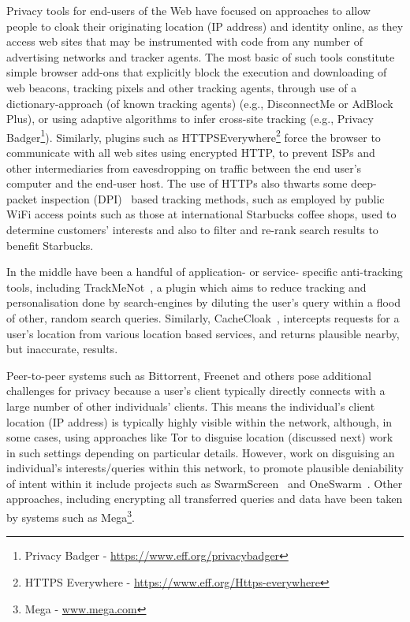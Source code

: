 \documentclass{IOS-Book-Article}     %
\begin{document}
Privacy tools for end-users of the Web have focused on approaches to allow people to cloak their originating location (IP address) and identity online, as they access web sites that may be instrumented with code from any number of advertising networks and tracker agents.  The most basic of such tools constitute simple browser add-ons that explicitly block the execution and downloading of web beacons, tracking pixels and other tracking agents, through use of a dictionary-approach (of known tracking agents) (e.g., DisconnectMe or AdBlock Plus), or using adaptive algorithms to infer cross-site tracking (e.g., Privacy Badger\footnote{Privacy Badger - \url{https://www.eff.org/privacybadger}}).  Similarly, plugins such as HTTPSEverywhere\footnote{HTTPS Everywhere - \url{https://www.eff.org/Https-everywhere}} force the browser to communicate with all web sites using encrypted HTTP, to prevent ISPs and other intermediaries from eavesdropping on traffic between the end user's computer and the end-user host.  The use of HTTPs also thwarts some deep-packet inspection (DPI)~\cite{kumar2006advanced} based tracking methods, such as employed by public WiFi access points such as those at international Starbucks coffee shops, used to determine customers' interests and also to filter and re-rank search results to benefit Starbucks.

In the middle have been a handful of application- or service- specific anti-tracking tools, including TrackMeNot~\cite{howe2009trackmenot}, a plugin which aims to reduce tracking and personalisation done by search-engines by diluting the user's query within a flood of other, random search queries. Similarly, CacheCloak~\cite{Meyerowitz:2009:HSF:1614320.1614358}, intercepts requests for a user's location from various location based services, and returns plausible nearby, but inaccurate, results.  

Peer-to-peer systems such as Bittorrent, Freenet and others pose additional challenges for privacy because a user's client typically directly connects with a large number of other individuals' clients.  This means the individual's client location (IP address) is typically highly visible within the network, although, in some cases, using approaches like Tor to disguise location (discussed next) work in such settings depending on particular details.  However, work on disguising an individual's interests/queries within this network, to promote plausible deniability of intent within it include projects such as SwarmScreen~\cite{choffnes2009swarmscreen} and OneSwarm~\cite{Isdal:2010:PPD:1851182.1851198}.  Other approaches, including encrypting all transferred queries and data have been taken by systems such as Mega\footnote{Mega - \url{www.mega.com}}.
\end{document}
